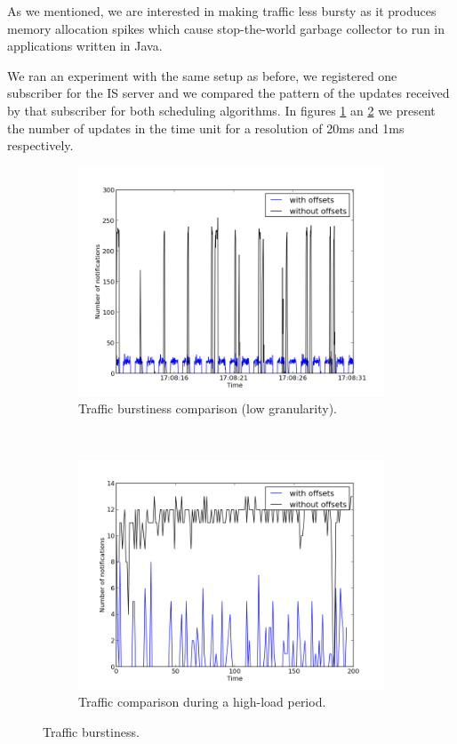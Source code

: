 As we mentioned, we are interested in making traffic less bursty as it produces memory allocation spikes which cause stop-the-world garbage collector to run in applications written in Java. 

We ran an experiment with the same setup as before, we registered one subscriber for the IS server and we compared the pattern of the updates received by that subscriber for both scheduling algorithms. In figures \ref{fig:burstiness} an \ref{fig:burstiness_hires} we present the number of updates in the time unit for a resolution of 20ms and 1ms respectively. 

\begin{figure}
\centering
\begin{subfigure}[ht]{0.45\textwidth}
\centering
\includegraphics[width=\textwidth]{Images/burstiness.png}
\caption{Traffic burstiness comparison (low granularity).}
\label{fig:burstiness}
\end{subfigure}
~
\begin{subfigure}[ht]{0.45\textwidth}
\centering
\includegraphics[width=\textwidth]{Images/burstiness_hires.png}
\caption{Traffic  comparison during a high-load period.}
\label{fig:burstiness_hires}
\end{subfigure}
\label{fig:burstiness_both}
\caption{Traffic burstiness.}
\end{figure}

